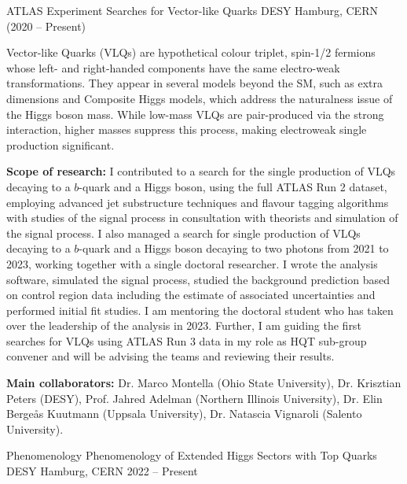 \begin{cventries}
  \cventry
    {ATLAS Experiment} %
    {Searches for Vector-like Quarks} %
    {DESY Hamburg, CERN} %
    {(2020 – Present)} %
    {
      \begin{cvitems} %
        \item {Vector-like Quarks (VLQs) are hypothetical colour triplet, spin-1/2 fermions whose left- and right-handed components have the same electro-weak transformations. They appear in several models beyond the SM, such as extra dimensions and Composite Higgs models, which address the
        naturalness issue of the Higgs boson mass. While low-mass VLQs are pair-produced via the strong
        interaction, higher masses suppress this process, making electroweak single production significant.}
        \item \textbf{Scope of research:} I contributed to a search for the single production of VLQs decaying to a \(b\)-quark and a Higgs boson, using the full ATLAS Run 2 dataset, employing advanced jet
        substructure techniques and flavour tagging algorithms with studies of the signal process in
        consultation with theorists and simulation of the signal process. I also managed a search for
        single production of VLQs decaying to a \(b\)-quark and a Higgs boson decaying to two photons
        from 2021 to 2023, working together with a single doctoral researcher. I wrote the analysis
        software, simulated the signal process, studied the background prediction based on control
        region data including the estimate of associated uncertainties and performed initial fit studies. I am mentoring the doctoral student who has taken over the leadership of the analysis in 2023. Further, I am guiding the first searches for VLQs using ATLAS Run 3 data in my role as HQT sub-group convener and will be advising the teams and reviewing their results.
        \item \textbf{Main collaborators:} Dr. Marco Montella (Ohio State University), Dr. Krisztian Peters (DESY), Prof. Jahred Adelman (Northern Illinois University), Dr. Elin Bergeås Kuutmann (Uppsala University), Dr. Natascia Vignaroli (Salento University).
      \end{cvitems}
    }
  \cventry
    {Phenomenology} %
    {Phenomenology of Extended Higgs Sectors with Top Quarks} %
    {DESY Hamburg, CERN} %
    {2022 -- Present} %
    {
      \begin{cvitems} %

\end{cvitems}}
\end{cventries}
